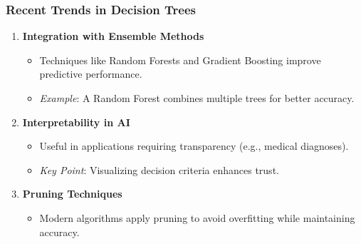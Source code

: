 \documentclass[aspectratio=169]{beamer}
\begin{document}
\begin{frame}[fragile]
    \frametitle{Recent Trends in Decision Trees}
    \begin{enumerate}
        \item \textbf{Integration with Ensemble Methods}
            \begin{itemize}
                \item Techniques like Random Forests and Gradient Boosting improve predictive performance.
                \item \textit{Example}: A Random Forest combines multiple trees for better accuracy.
            \end{itemize}
        
        \item \textbf{Interpretability in AI}
            \begin{itemize}
                \item Useful in applications requiring transparency (e.g., medical diagnoses).
                \item \textit{Key Point}: Visualizing decision criteria enhances trust.
            \end{itemize}
        
        \item \textbf{Pruning Techniques}
            \begin{itemize}
                \item Modern algorithms apply pruning to avoid overfitting while maintaining accuracy.
            \end{itemize}
    \end{enumerate}
\end{frame}
\end{document}
